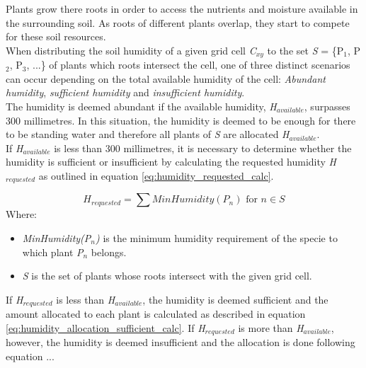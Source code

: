 Plants grow there roots in order to access the nutrients and moisture available in the surrounding soil. As roots of different plants overlap, they start to compete for these soil resources.\\

When distributing the soil humidity of a given grid cell \textit{C$_{xy}$} to the set \textit{S} = \{P$_{1}$, P$_{2}$, P$_{3}$, ...\} of plants which roots intersect the cell, one of three distinct scenarios can occur depending on the total available humidity of the cell: \textit{Abundant humidity}, \textit{sufficient humidity} and \textit{insufficient humidity}.\\

The humidity is deemed abundant if the available humidity, \textit{H$_{available}$}, surpasses 300 millimetres. In this situation, the humidity is deemed to be enough for there to be standing water and therefore all plants of \textit{S} are allocated \textit{H$_{available}$}. \\

If \textit{H$_{available}$} is less than 300 millimetres, it is necessary to determine whether the humidity is sufficient or insufficient by calculating the requested humidity \textit{H$_{requested}$} as outlined in equation \ref{eq:humidity_requested_calc}. 

\begin{equation}
H_{requested} = \sum MinHumidity(P_{n}) \text{ for } n \in S
\label{eq:humidity_requested_calc}
\end{equation}
Where:
\begin{itemize}
\item \textit{MinHumidity(P$_{n}$)} is the minimum humidity requirement of the specie to which plant \textit{P$_{n}$} belongs.
\item \textit{S} is the set of plants whose roots intersect with the given grid cell.
\end{itemize}

If \textit{H$_{requested}$} is less than \textit{H$_{available}$}, the humidity is deemed sufficient and the amount allocated to each plant is calculated as described in equation \ref{eq:humidity_allocation_sufficient_calc}. If \textit{H$_{requested}$} is more than \textit{H$_{available}$}, however, the humidity is deemed insufficient and the allocation is done following equation ...

